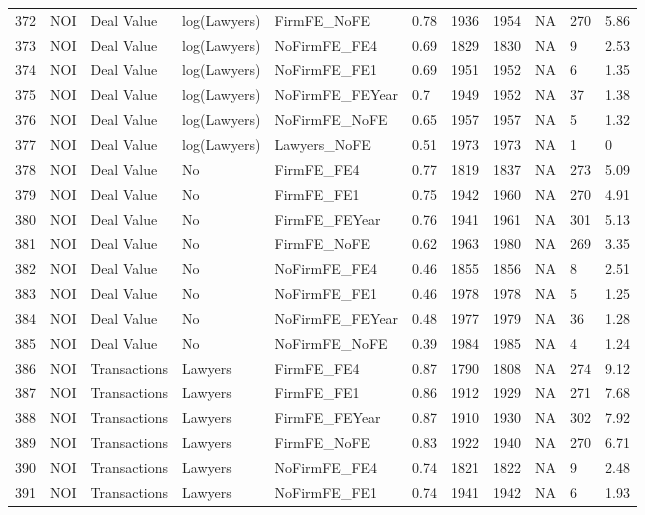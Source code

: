 \documentclass{article}
\begin{document}
\begin{table}[H]
\begin{tabular}{rllllllllll}
  372 & NOI & Deal Value & log(Lawyers) & FirmFE\_NoFE & 0.78 & 1936 & 1954 & NA & 270 & 5.86 \\
  373 & NOI & Deal Value & log(Lawyers) & NoFirmFE\_FE4 & 0.69 & 1829 & 1830 & NA & 9 & 2.53 \\
  374 & NOI & Deal Value & log(Lawyers) & NoFirmFE\_FE1 & 0.69 & 1951 & 1952 & NA & 6 & 1.35 \\
  375 & NOI & Deal Value & log(Lawyers) & NoFirmFE\_FEYear & 0.7 & 1949 & 1952 & NA & 37 & 1.38 \\
  376 & NOI & Deal Value & log(Lawyers) & NoFirmFE\_NoFE & 0.65 & 1957 & 1957 & NA & 5 & 1.32 \\
  377 & NOI & Deal Value & log(Lawyers) & Lawyers\_NoFE & 0.51 & 1973 & 1973 & NA & 1 & 0 \\
  378 & NOI & Deal Value & No & FirmFE\_FE4 & 0.77 & 1819 & 1837 & NA & 273 & 5.09 \\
  379 & NOI & Deal Value & No & FirmFE\_FE1 & 0.75 & 1942 & 1960 & NA & 270 & 4.91 \\
  380 & NOI & Deal Value & No & FirmFE\_FEYear & 0.76 & 1941 & 1961 & NA & 301 & 5.13 \\
  381 & NOI & Deal Value & No & FirmFE\_NoFE & 0.62 & 1963 & 1980 & NA & 269 & 3.35 \\
  382 & NOI & Deal Value & No & NoFirmFE\_FE4 & 0.46 & 1855 & 1856 & NA & 8 & 2.51 \\
  383 & NOI & Deal Value & No & NoFirmFE\_FE1 & 0.46 & 1978 & 1978 & NA & 5 & 1.25 \\
  384 & NOI & Deal Value & No & NoFirmFE\_FEYear & 0.48 & 1977 & 1979 & NA & 36 & 1.28 \\
  385 & NOI & Deal Value & No & NoFirmFE\_NoFE & 0.39 & 1984 & 1985 & NA & 4 & 1.24 \\
  386 & NOI & Transactions & Lawyers & FirmFE\_FE4 & 0.87 & 1790 & 1808 & NA & 274 & 9.12 \\
  387 & NOI & Transactions & Lawyers & FirmFE\_FE1 & 0.86 & 1912 & 1929 & NA & 271 & 7.68 \\
  388 & NOI & Transactions & Lawyers & FirmFE\_FEYear & 0.87 & 1910 & 1930 & NA & 302 & 7.92 \\
  389 & NOI & Transactions & Lawyers & FirmFE\_NoFE & 0.83 & 1922 & 1940 & NA & 270 & 6.71 \\
  390 & NOI & Transactions & Lawyers & NoFirmFE\_FE4 & 0.74 & 1821 & 1822 & NA & 9 & 2.48 \\
  391 & NOI & Transactions & Lawyers & NoFirmFE\_FE1 & 0.74 & 1941 & 1942 & NA & 6 & 1.93 \\

\end{tabular}
\end{table}
\end{document}
